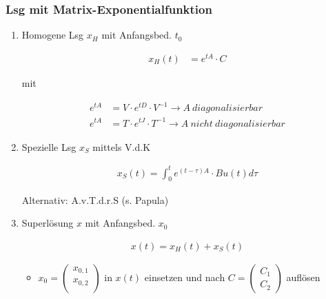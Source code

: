 \documentclass[10pt,a4paper]{article}
\begin{document}
\subsubsection{Lsg mit Matrix-Exponentialfunktion}

\begin{enumerate}[(1)]
    \item Homogene Lsg $x_H$ mit Anfangsbed. $t_0$
  \begin{mdframed}[style=exercise]
    \begin{align}
        x_H(t) &= e^{tA} \cdot C
    \end{align}
  \end{mdframed}
  mit
  \begin{mdframed}[style=exercise]
    \begin{align}
        e^{tA} &= V \cdot e^{tD} \cdot V^{-1} \rightarrow A \ diagonalisierbar \\
        e^{tA} &= T \cdot e^{tJ} \cdot T^{-1} \rightarrow A \ nicht\ diagonalisierbar
    \end{align}
  \end{mdframed}

    \item Spezielle Lsg $x_S$ mittels V.d.K 
  \begin{mdframed}[style=exercise]
    \begin{align}
        x_S(t) = \displaystyle\int_{0}^{t} e^{(t-\tau)A} \cdot B u(t) d\tau
    \end{align}
  \end{mdframed}
    Alternativ: A.v.T.d.r.S (s. Papula)

\item Superlösung $x$ mit Anfangsbed. $x_0$
  \begin{mdframed}[style=exercise]
    \begin{align}
        x(t) = x_H(t) + x_S(t)
    \end{align}
  \end{mdframed}
  \begin{itemize}
      \item $x_0 = 
        \begin{pmatrix}
            x_{0,1} \\
            x_{0,2} \\
        \end{pmatrix}$ 
          in $x(t)$ einsetzen und nach $C = 
        \begin{pmatrix}
            C_1 \\
            C_2
        \end{pmatrix}$ 
          auflösen
  \end{itemize}
\end{enumerate}
\end{document}
